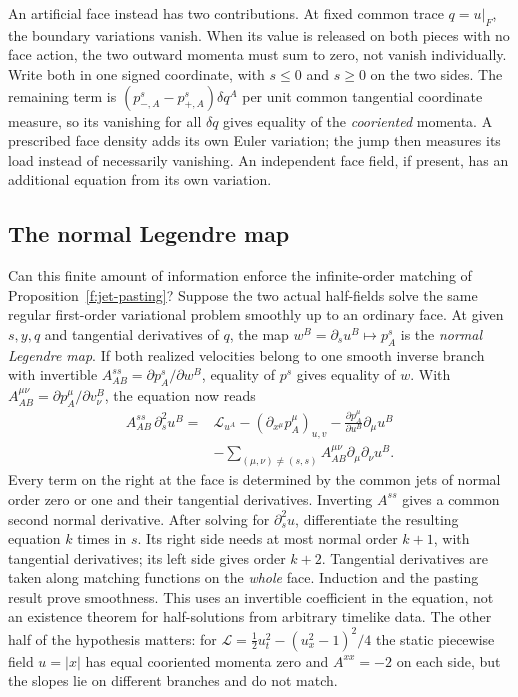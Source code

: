 An artificial face instead has two contributions. At fixed common trace $q=u|_F$, the boundary variations vanish. When its value is released on both pieces with no face action, the two outward momenta must sum to zero, not vanish individually. Write both in one signed coordinate, with $s\le0$ and $s\ge0$ on the two sides. The remaining term is $(p^s_{-,A}-p^s_{+,A})\delta q^A$ per unit common tangential coordinate measure, so its vanishing for all $\delta q$ gives equality of the \emph{cooriented} momenta. A prescribed face density adds its own Euler variation; the jump then measures its load instead of necessarily vanishing. An independent face field, if present, has an additional equation from its own variation.

\subsection{The normal Legendre map}\label{f:normal-legendre}
Can this finite amount of information enforce the infinite-order matching of Proposition~\ref{f:jet-pasting}? Suppose the two actual half-fields solve the same regular first-order variational problem smoothly up to an ordinary face. At given $s,y,q$ and tangential derivatives of $q$, the map $w^B=\partial_s u^B\mapsto p^s_A$ is the \emph{normal Legendre map}. If both realized velocities belong to one smooth inverse branch with invertible $A_{AB}^{ss}=\partial p^s_A/\partial w^B$, equality of $p^s$ gives equality of $w$. With $A_{AB}^{\mu\nu}=\partial p_A^\mu/\partial v^B_\nu$, the equation now reads
\begin{align*}
 A_{AB}^{ss}\,\partial_s^2u^B={}&\mathcal L_{u^A}-(\partial_{x^\mu}p_A^\mu)_{u,v}
 -\frac{\partial p_A^\mu}{\partial u^B}\partial_\mu u^B\\[-1mm]
 &-\sum_{(\mu,\nu)\ne(s,s)} A_{AB}^{\mu\nu}\partial_\mu\partial_\nu u^B .
\end{align*}
Every term on the right at the face is determined by the common jets of normal order zero or one and their tangential derivatives. Inverting $A^{ss}$ gives a common second normal derivative. After solving for $\partial_s^2u$, differentiate the resulting equation $k$ times in $s$. Its right side needs at most normal order $k+1$, with tangential derivatives; its left side gives order $k+2$. Tangential derivatives are taken along matching functions on the \emph{whole} face. Induction and the pasting result prove smoothness. This uses an invertible coefficient in the equation, not an existence theorem for half-solutions from arbitrary timelike data. The other half of the hypothesis matters: for $\mathcal L=\tfrac12u_t^2-(u_x^2-1)^2/4$ the static piecewise field $u=|x|$ has equal cooriented momenta zero and $A^{xx}=-2$ on each side, but the slopes lie on different branches and do not match.


